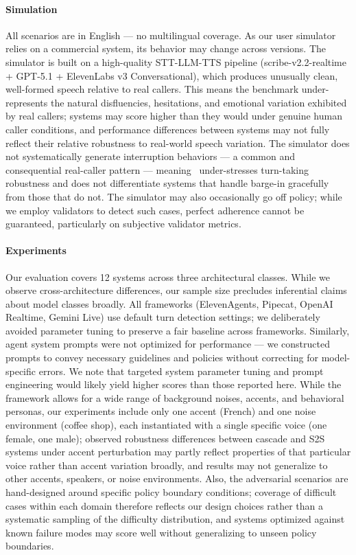\paragraph{Simulation}
All scenarios are in English — no multilingual coverage. As our user simulator relies on a commercial system, its behavior may change across versions.
The simulator is built on a high-quality STT-LLM-TTS pipeline (scribe-v2.2-realtime + GPT-5.1 + ElevenLabs v3 Conversational), which produces unusually clean, well-formed speech relative to real callers. This means the benchmark under-represents the natural disfluencies, hesitations, and emotional variation exhibited by real callers; systems may score higher than they would under genuine human caller conditions, and performance differences between systems may not fully reflect their relative robustness to real-world speech variation.
The simulator does not systematically generate interruption behaviors — a common and consequential real-caller pattern — meaning \framework~under-stresses turn-taking robustness and does not differentiate systems that handle barge-in gracefully from those that do not.
The simulator may also occasionally go off policy; while we employ validators to detect such cases, perfect adherence cannot be guaranteed, particularly on subjective validator metrics.


\paragraph{Experiments}
Our evaluation covers 12 systems across three architectural classes. While we observe cross-architecture differences, our sample size precludes inferential claims about model classes broadly.
All frameworks (ElevenAgents, Pipecat, OpenAI Realtime, Gemini Live) use default turn detection settings; we deliberately avoided parameter tuning to preserve a fair baseline across frameworks. Similarly, agent system prompts were not optimized for performance — we constructed prompts to convey necessary guidelines and policies without correcting for model-specific errors. We note that targeted system parameter tuning and prompt engineering would likely yield higher scores than those reported here.
While the framework allows for a wide range of background noises, accents, and behavioral personas, our experiments include only one accent (French) and one noise environment (coffee shop), each instantiated with a single specific voice (one female, one male); observed robustness differences between cascade and S2S systems under accent perturbation may partly reflect properties of that particular voice rather than accent variation broadly, and results may not generalize to other accents, speakers, or noise environments.
Also, the adversarial scenarios are hand-designed around specific policy boundary conditions; coverage of difficult cases within each domain therefore reflects our design choices rather than a systematic sampling of the difficulty distribution, and systems optimized against known failure modes may score well without generalizing to unseen policy boundaries. 




